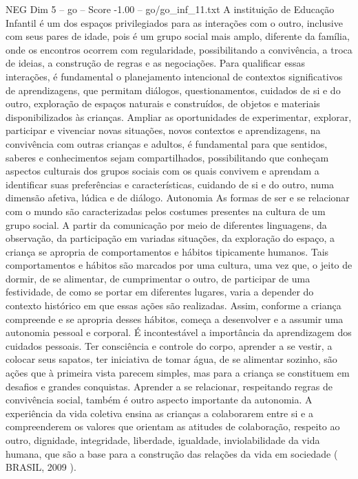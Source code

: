 \begin{textsample}{NEG Dim 5 – go – Score -1.00 – go/go\_inf\_11.txt}
A instituição de Educação Infantil é um dos espaços privilegiados para as interações com o outro, inclusive com seus pares de idade, pois é um grupo social mais amplo, diferente da família, onde os encontros ocorrem com regularidade, possibilitando a convivência, a troca de ideias, a construção de regras e as negociações.
Para qualificar essas interações, é fundamental o planejamento intencional de contextos significativos de aprendizagens, que permitam diálogos, questionamentos, cuidados de si e do outro, exploração de espaços naturais e construídos, de objetos e materiais disponibilizados às crianças.
Ampliar as oportunidades de experimentar, explorar, participar e vivenciar novas situações, novos contextos e aprendizagens, na convivência com outras crianças e adultos, é fundamental para que sentidos, saberes e conhecimentos sejam compartilhados, possibilitando que conheçam aspectos culturais dos grupos sociais com os quais convivem e aprendam a identificar suas preferências e características, cuidando de si e do outro, numa dimensão afetiva, lúdica e de diálogo.
Autonomia As formas de ser e se relacionar com o mundo são caracterizadas pelos costumes presentes na cultura de um grupo social.
A partir da comunicação por meio de diferentes linguagens, da observação, da participação em variadas situações, da exploração do espaço, a criança se apropria de comportamentos e hábitos tipicamente humanos.
Tais comportamentos e hábitos são marcados por uma cultura, uma vez que, o jeito de dormir, de se alimentar, de cumprimentar o outro, de participar de uma festividade, de como se portar em diferentes lugares, varia a depender do contexto histórico em que essas ações são realizadas.
Assim, conforme a criança compreende e se apropria desses hábitos, começa a desenvolver e a assumir uma autonomia pessoal e corporal.
É incontestável a importância da aprendizagem dos cuidados pessoais.
Ter consciência e controle do corpo, aprender a se vestir, a colocar seus sapatos, ter iniciativa de tomar água, de se alimentar sozinho, são ações que à primeira vista parecem simples, mas para a criança se constituem em desafios e grandes conquistas.
Aprender a se relacionar, respeitando regras de convivência social, também é outro aspecto importante da autonomia.
A experiência da vida coletiva ensina as crianças a colaborarem entre si e a compreenderem os valores que orientam as atitudes de colaboração, respeito ao outro, dignidade, integridade, liberdade, igualdade, inviolabilidade da vida humana, que são a base para a construção das relações da vida em sociedade ( BRASIL, 2009 ).

\end{textsample}
